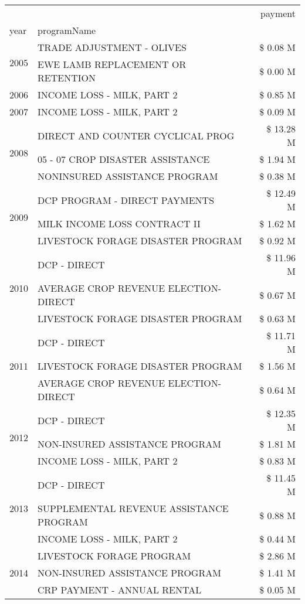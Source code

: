\begin{tabular}{llr}
\toprule
 &  & payment \\
year & programName &  \\
\midrule
\multirow[t]{2}{*}{2005} & TRADE ADJUSTMENT - OLIVES & \$ 0.08 M \\
 & EWE LAMB REPLACEMENT OR RETENTION & \$ 0.00 M \\
\cline{1-3}
2006 & INCOME LOSS - MILK, PART 2 & \$ 0.85 M \\
\cline{1-3}
2007 & INCOME LOSS - MILK, PART 2 & \$ 0.09 M \\
\cline{1-3}
\multirow[t]{3}{*}{2008} & DIRECT AND COUNTER CYCLICAL PROG & \$ 13.28 M \\
 & 05 - 07 CROP DISASTER ASSISTANCE & \$ 1.94 M \\
 & NONINSURED ASSISTANCE PROGRAM & \$ 0.38 M \\
\cline{1-3}
\multirow[t]{3}{*}{2009} & DCP PROGRAM - DIRECT PAYMENTS & \$ 12.49 M \\
 & MILK INCOME LOSS CONTRACT II & \$ 1.62 M \\
 & LIVESTOCK FORAGE DISASTER  PROGRAM & \$ 0.92 M \\
\cline{1-3}
\multirow[t]{3}{*}{2010} & DCP - DIRECT & \$ 11.96 M \\
 & AVERAGE CROP REVENUE ELECTION-DIRECT & \$ 0.67 M \\
 & LIVESTOCK FORAGE DISASTER PROGRAM & \$ 0.63 M \\
\cline{1-3}
\multirow[t]{3}{*}{2011} & DCP - DIRECT & \$ 11.71 M \\
 & LIVESTOCK FORAGE DISASTER PROGRAM & \$ 1.56 M \\
 & AVERAGE CROP REVENUE ELECTION-DIRECT & \$ 0.64 M \\
\cline{1-3}
\multirow[t]{3}{*}{2012} & DCP - DIRECT & \$ 12.35 M \\
 & NON-INSURED ASSISTANCE PROGRAM & \$ 1.81 M \\
 & INCOME LOSS - MILK, PART 2 & \$ 0.83 M \\
\cline{1-3}
\multirow[t]{3}{*}{2013} & DCP - DIRECT & \$ 11.45 M \\
 & SUPPLEMENTAL REVENUE ASSISTANCE PROGRAM & \$ 0.88 M \\
 & INCOME LOSS - MILK, PART 2 & \$ 0.44 M \\
\cline{1-3}
\multirow[t]{3}{*}{2014} & LIVESTOCK FORAGE PROGRAM & \$ 2.86 M \\
 & NON-INSURED ASSISTANCE PROGRAM & \$ 1.41 M \\
 & CRP PAYMENT - ANNUAL RENTAL & \$ 0.05 M \\

\end{tabular}
